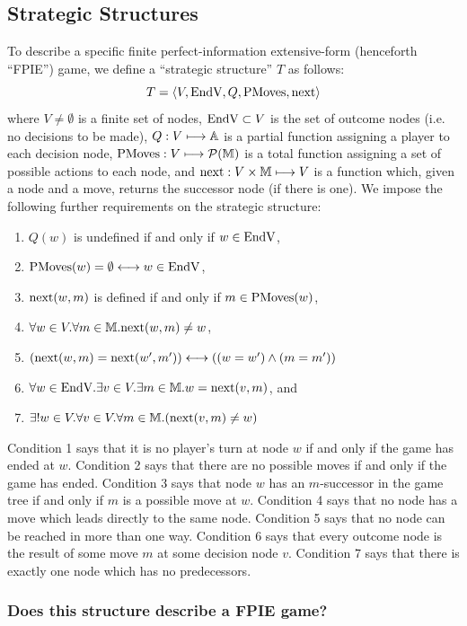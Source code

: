 \documentclass{article}
\begin{document}
\subsection{Strategic Structures}
To describe a specific finite perfect-information extensive-form (henceforth ``FPIE'') game, we define a ``strategic structure'' $T$ as follows:
\begin{equation*}
    T = \langle V,\text{EndV},Q,\text{PMoves},\text{next}\rangle
\end{equation*}
where $V \ne\emptyset$ is a finite set of nodes, $\text{EndV}\subset V$ is the set of outcome nodes (i.e. no decisions to be made), $Q:V\longmapsto\mathbb{A}$ is a partial function assigning a player to each decision node, $\text{PMoves}:V\longmapsto\mathcal P(\mathbb{M})$ is a total function assigning a set of possible actions to each node, and $\text{next}:V\times\mathbb{M}\longmapsto V$ is a function which, given a node and a move, returns the successor node (if there is one). We impose the following further requirements on the strategic structure:
\begin{enumerate}
    \item $Q(w)$ is undefined if and only if $w\in\text{EndV}$,
    \item $\text{PMoves}(w)=\emptyset\longleftrightarrow w\in\text{EndV}$,
    \item $\text{next}(w,m)$ is defined if and only if $m\in\text{PMoves}(w)$,
    \item $\forall w\in V.\forall m\in\mathbb{M}.\text{next}(w,m)\ne w$,
    \item $(\text{next}(w,m)=\text{next}(w',m'))\longleftrightarrow((w=w')\land(m=m'))$
    \item $\forall w\in\text{EndV}.\exists v\in V.\exists m\in\mathbb{M}.w =\text{next}(v,m)$, and
    \item $\exists! w\in V.\forall v\in V.\forall m\in\mathbb{M}.(\text{next}(v,m)\ne w)$
\end{enumerate}

Condition 1 says that it is no player's turn at node $w$ if and only if the game has ended at $w$. Condition 2 says that there are no possible moves if and only if the game has ended. Condition 3 says that node $w$ has an $m$-successor in the game tree if and only if $m$ is a possible move at $w$. Condition 4 says that no node has a move which leads directly to the same node. Condition 5 says that no node can be reached in more than one way. Condition 6 says that every outcome node is the result of some move $m$ at some decision node $v$. Condition 7 says that there is exactly one node which has no predecessors.

\subsubsection{Does this structure describe a FPIE game?}
\end{document}
